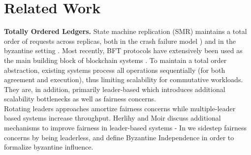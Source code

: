 
\section{Related Work}  
\par \textbf{Totally Ordered Ledgers.}
State machine replication (SMR) \cite{schneider1990implementing} maintains a total order of requests across replicas, both in the crash failure model  \cite{Li2007, Lampson2001, Lamport98Paxos, Lamport2005a, Lamport2005, Lamport01Paxos, Chandra2007}  \cite{junqueira2011zab, van2014vive, oki1988viewstampeda, liskov2012viewstamped, ongaro2014search}) and in the byzantine setting \cite{castro1999practical, martin2006fast, kotla2007zyzzyva,  gueta2018sbft, clement2009making, buchman2016tendermint, yin2019hotstuff, Clement09Upright, duan2014hbft    , pires2018generalized, bessani2014state, lamport2011byzantizing, arun2019ezbft, malkhi2019flexible, duan2014hbft, yin2003separating, Guerraoui08Next, Kotla04High,  liskov2010viewstamped}. Most recently, BFT protocols have extensively been used as the main building block of blockchain systems \cite{Hyperledger, EthereumQuorum, buchman2016tendermint, al2017chainspace, kokoris2018omniledger,  gilad2017algorand, baudet2019state}. To maintain a total order abstraction, existing systems process  all operations sequentially (for both agreement and execution), thus limiting scalability for commutative workloads. They are, in addition, primarily leader-based which introduces additional scalability bottlenecks \cite{moraru2013there, zhang2015tapir, stathakopoulou2019mir} as well as fairness concerns. \\
Rotating leaders approaches \cite{clement2009making, buchman2016tendermint, yin2019hotstuff} amortize fairness concerns while multiple-leader based systems \cite{moraru2013there, stathakopoulou2019mir, arun2019ezbft, li2016sarek} increase throughput. Herlihy and Moir \cite{herlihy2016enhancing} discuss additional mechanisms to improve fairness in leader-based systems - In \sys we sidestep fairness concerns by being leaderless, and define Byzantine Independence in order to formalize byzantine influence.

